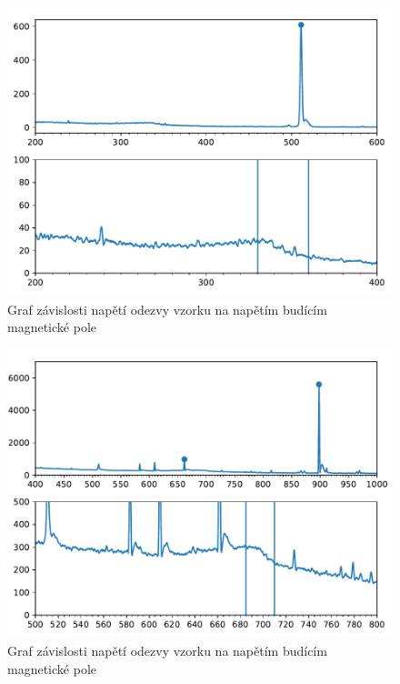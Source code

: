 \documentclass{article}
\begin{document}
\begin{figure}[h]
  \hspace*{-1em}
  \includegraphics[scale=0.8]{figs/Na22.pdf}
  \caption{Graf závislosti napětí odezvy vzorku na napětím budícím magnetické pole}
\end{figure}
\begin{figure}[h]
  \hspace*{-1em}
  \includegraphics[scale=0.8]{figs/Y88.pdf}
  \caption{Graf závislosti napětí odezvy vzorku na napětím budícím magnetické pole}
\end{figure}
\end{document}
